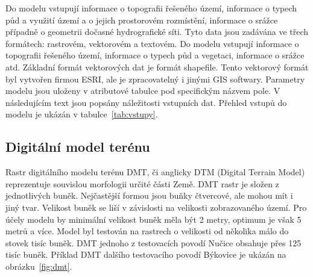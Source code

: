 


Do modelu vstupují informace o topografii řešeného území, informace o typech půd a využití území a o jejich prostorovém rozmístění, informace o srážce případně o geometrii dočasné hydrografické síti.
Tyto data jsou zadávána ve třech formátech: rastrovém, vektorovém a textovém. Do modelu vstupují informace o topografii řešeného území, informace o typech půd a vegetaci, informace o srážce atd. Základní formát vektorových dat je formát shapefile. Tento vektorový formát byl vytvořen firmou ESRI, ale je zpracovatelný i jinými GIS softwary. Parametry modelu jsou uloženy v atributové tabulce pod specifickým názvem pole. 
V následujícím text jsou popsány náležitosti vstupních dat. 
% 
Přehled vstupů do modelu je ukázán v tabulce~\ref{tab:vstupy}.


% 

% 
% 
% 
% 
% 
% 
% 









\subsection{Digitální model terénu} \label{sec:vstupdmt} 

Rastr digitálního modelu terénu DMT, či anglicky DTM (Digital Terrain Model) reprezentuje souvislou morfologii určité části Země. DMT rastr je složen z jednotlivých buněk. Nejčastější formou jsou buňky čtvercové, ale mohou mít i jiný tvar.  Velikost buněk se liší v závislosti na velikosti zobrazovaného území. Pro účely modelu \smod by minimální velikost buněk měla být 2 metry, optimum je však 5 metrů a více. Model byl testován na rastrech o velikosti od několika málo do stovek tisíc buněk. DMT jednoho z testovacích povodí Nučice obsahuje přes 125 tisíc buněk. Příklad DMT dalšího testovacího povodí Býkovice je ukázán na obrázku~\ref{fig:dmt}.


